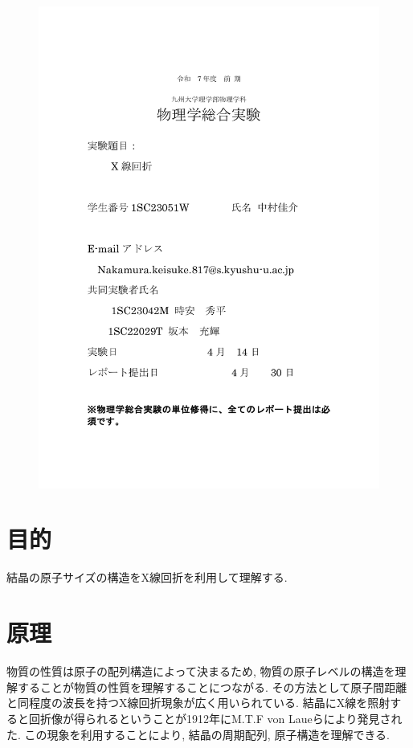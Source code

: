 \documentclass[11pt]{ltjsarticle}
\begin{document}
  \begin{figure}[H]
    \centering
    \includegraphics[width=\columnwidth]{hyoushi_xrd.pdf}
  \end{figure}
  
  \section*{目的}
    結晶の原子サイズの構造をX線回折を利用して理解する.
  \section*{原理}
    物質の性質は原子の配列構造によって決まるため, 物質の原子レベルの構造を理解することが物質の性質を理解することにつながる. その方法として原子間距離と同程度の波長を持つX線回折現象が広く用いられている. 
    結晶にX線を照射すると回折像が得られるということが1912年にM.T.F von Laueらにより発見された.  この現象を利用することにより, 結晶の周期配列, 原子構造を理解できる. 
\end{document}
